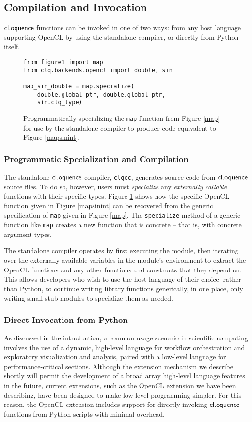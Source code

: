 \documentclass[10pt, conference, compsocconf]{IEEEtran}
\begin{document}
\subsection{Compilation and Invocation}
$\textsf{cl.oquence}$ functions can be invoked in one of two ways: from any host language supporting OpenCL by using the standalone compiler, or directly from Python itself. 
\begin{figure}\small{\begin{verbatim}
from figure1 import map
from clq.backends.opencl import double, sin

map_sin_double = map.specialize(
    double.global_ptr, double.global_ptr, 
    sin.clq_type)
\end{verbatim}}
\caption{Programmatically specializing the \texttt{map} function from Figure \ref{map} for use by the standalone compiler to produce code equivalent to Figure \ref{mapsinint}.}
\label{specialization}
\end{figure}


\subsubsection{Programmatic Specialization and Compilation}
The standalone $\textsf{cl.oquence}$ compiler, \verb|clqcc|, generates source code from $\textsf{cl.oquence}$ source files. To do so, however, users must {\it specialize} any {\it externally callable} functions with their specific types. Figure \ref{specialization} shows how the specific OpenCL function given in Figure \ref{mapsinint} can be recovered from the generic specification of \verb|map| given in Figure \ref{map}. The \verb|specialize| method of a generic function like \verb|map| creates a new function that is concrete -- that is, with concrete argument types.

The standalone compiler operates by first executing the module, then iterating over the externally available variables in the module's environment to extract the OpenCL functions and any other functions and constructs that they depend on. This allows developers who wish to use the host language of their choice, rather than Python, to continue writing library functions generically, in one place, only writing small stub modules to specialize them as needed.

\subsubsection{Direct Invocation from Python}\label{direct}
As discussed in the introduction, a common usage scenario in scientific computing involves the use of a dynamic, high-level language for workflow orchestration and exploratory visualization and analysis, paired with a low-level language for performance-critical sections. Although the extension mechanism we describe shortly will permit the development of a broad array high-level language features in the future, current extensions, such as the OpenCL extension we have been describing, have been designed to make low-level programming simpler. For this reason, the OpenCL extension includes support for directly invoking $\textsf{cl.oquence}$ functions from Python scripts with minimal overhead.
\end{document}
